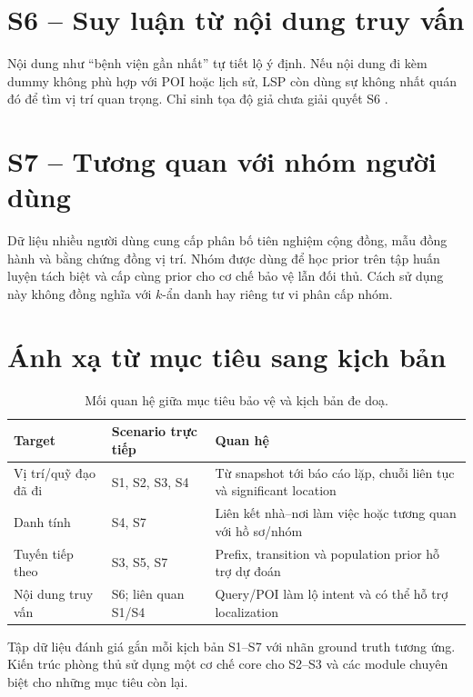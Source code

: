 \documentclass[12pt,a4paper,oneside]{report}
\begin{document}
\section{S6 -- Suy luận từ nội dung truy vấn}

Nội dung như ``bệnh viện gần nhất'' tự tiết lộ ý định. Nếu nội dung đi kèm dummy không phù hợp với POI hoặc lịch sử, LSP còn dùng sự không nhất quán đó để tìm vị trí quan trọng. Chỉ sinh tọa độ giả chưa giải quyết S6 \citep{wu2021fakequery}.

\section{S7 -- Tương quan với nhóm người dùng}

Dữ liệu nhiều người dùng cung cấp phân bố tiên nghiệm cộng đồng, mẫu đồng hành và bằng chứng đồng vị trí. Nhóm được dùng để học prior trên tập huấn luyện tách biệt và cấp cùng prior cho cơ chế bảo vệ lẫn đối thủ. Cách sử dụng này không đồng nghĩa với $k$-ẩn danh hay riêng tư vi phân cấp nhóm.

\clearpage


\clearpage
\section{Ánh xạ từ mục tiêu sang kịch bản}

\begin{table}[htbp]
\centering
\small
\caption{Mối quan hệ giữa mục tiêu bảo vệ và kịch bản đe doạ.}
\label{tab:target-scenario}
\begin{tabularx}{\textwidth}{P{3.2cm}P{4.0cm}Y}
\toprule
\textbf{Target} & \textbf{Scenario trực tiếp} & \textbf{Quan hệ} \\
\midrule
Vị trí/quỹ đạo đã đi & S1, S2, S3, S4 & Từ snapshot tới báo cáo lặp, chuỗi liên tục và significant location \\
Danh tính & S4, S7 & Liên kết nhà--nơi làm việc hoặc tương quan với hồ sơ/nhóm \\
Tuyến tiếp theo & S3, S5, S7 & Prefix, transition và population prior hỗ trợ dự đoán \\
Nội dung truy vấn & S6; liên quan S1/S4 & Query/POI làm lộ intent và có thể hỗ trợ localization \\
\bottomrule
\end{tabularx}
\end{table}

Tập dữ liệu đánh giá gắn mỗi kịch bản S1--S7 với nhãn ground truth tương ứng. Kiến trúc phòng thủ sử dụng một cơ chế core cho S2--S3 và các module chuyên biệt cho những mục tiêu còn lại.
\end{document}
